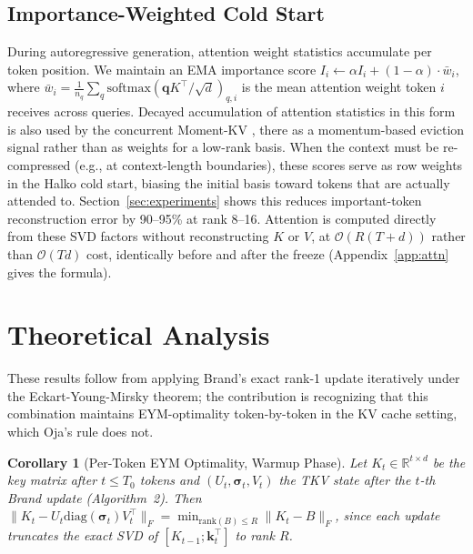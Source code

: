 \documentclass{article}
\newtheorem{corollary}{Corollary}
\newcommand{\R}{\mathbb{R}}
\begin{document}
\subsection{Importance-Weighted Cold Start}
\label{sec:importance}

During autoregressive generation, attention weight statistics accumulate per
token position.  We maintain an
EMA importance score $I_i \leftarrow \alpha I_i + (1-\alpha) \cdot \bar{w}_i$,
where $\bar{w}_i = \frac{1}{n_q} \sum_{q} \mathrm{softmax}(\mathbf{q} K^\top / \sqrt{d})_{q,i}$
is the mean attention weight token $i$ receives across queries.  Decayed
accumulation of attention statistics in this form is also used by the
concurrent Moment-KV \citep{momentkv2024}, there as a momentum-based
eviction signal rather than as weights for a low-rank basis.
When the context must be re-compressed (e.g., at context-length boundaries),
these scores serve as row weights in the Halko cold start, biasing the initial
basis toward tokens that are actually attended to.  Section~\ref{sec:experiments}
shows this reduces important-token reconstruction error by 90--95\% at rank 8--16.
Attention is computed directly from these SVD factors without
reconstructing $K$ or $V$, at $\mathcal{O}(R(T{+}d))$ rather than
$\mathcal{O}(Td)$ cost, identically before and after the freeze
(Appendix~\ref{app:attn} gives the formula).

\section{Theoretical Analysis}
\label{sec:theory}

These results follow from applying Brand's exact rank-1 update iteratively
under the Eckart-Young-Mirsky theorem; the contribution is recognizing that
this combination maintains EYM-optimality token-by-token in the KV cache
setting, which Oja's rule does not.

\begin{corollary}[Per-Token EYM Optimality, Warmup Phase]
\label{cor:eym}
Let $K_t \in \R^{t \times d}$ be the key matrix after $t \leq T_0$ tokens
and $(U_t, \boldsymbol{\sigma}_t, V_t)$ the TKV state after the $t$-th Brand
update (Algorithm~2). Then
$\| K_t - U_t \mathrm{diag}(\boldsymbol{\sigma}_t) V_t^\top \|_F
  = \min_{\mathrm{rank}(B) \leq R} \| K_t - B \|_F$,
since each update truncates the exact SVD of $[K_{t-1}; \mathbf{k}_t^\top]$
to rank $R$.
\end{corollary}
\end{document}
